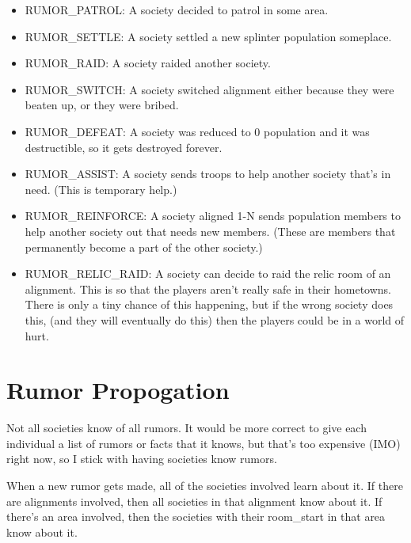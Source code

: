 \begin{itemize}

\item RUMOR\_PATROL: A society decided to patrol in some area.

\item RUMOR\_SETTLE: A society settled a new splinter population someplace.

\item RUMOR\_RAID: A society raided another society.

\item RUMOR\_SWITCH: A society switched alignment either because they were
  beaten up, or they were bribed.

\item RUMOR\_DEFEAT: A society was reduced to 0 population and it was
  destructible, so it gets destroyed forever.

\item RUMOR\_ASSIST: A society sends troops to help another society that's
in need. (This is temporary help.)
\item RUMOR\_REINFORCE: A society aligned 1-N sends population members
to help another society out that needs new members. (These are members that
permanently become a part of the other society.)


\item RUMOR\_RELIC\_RAID: A society can decide to raid the relic room
of an alignment. This is so that the players aren't really safe in their
hometowns. There is only a tiny chance of this happening, but if the
wrong society does this, (and they will eventually do this) then the
players could be in a world of hurt.

\end{itemize}

\section{Rumor Propogation}

Not all societies know of all rumors. It would be more correct to
give each individual a list of rumors or facts that it knows,
but that's too expensive (IMO) right now, so I stick with having
societies know rumors.

When a new rumor gets made, all of the societies involved learn
about it. If there are alignments involved, then all societies in
that alignment know about it. If there's an area involved, then
the societies with their room\_start in that area know about it.

